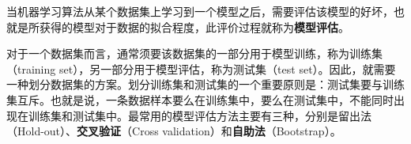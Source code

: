 

当机器学习算法从某个数据集上学习到一个模型之后，需要评估该模型的好坏，也就是所获得的模型对于数据的拟合程度，此评价过程就称为\textbf{模型评估}。

对于一个数据集而言，通常须要该数据集的一部分用于模型训练，称为训练集（training set），另一部分用于模型评估，称为测试集（test set）。因此，就需要一种划分数据集的方案。划分训练集和测试集的一个重要原则是：测试集要与训练集互斥。也就是说，一条数据样本要么在训练集中，要么在测试集中，不能同时出现在训练集和测试集中。最常用的模型评估方法主要有三种，分别是留出法（Hold-out）、\textbf{交叉验证}（Cross validation）和\textbf{自助法}（Bootstrap）。